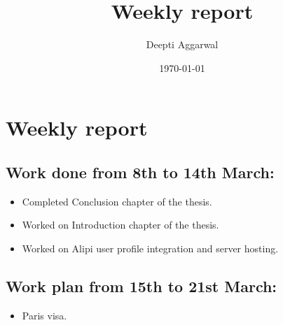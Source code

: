 \documentclass[11pt]{article}
\title{Weekly report}
\author{Deepti Aggarwal}
\date{\today}
\begin{document}
\maketitle

\setcounter{tocdepth}{3}
\vspace*{1cm}
\section{Weekly report}
\label{sec-1}

\subsection{Work done from 8th to 14th March:}
\label{sec-1-1}
\begin{itemize}
\item Completed Conclusion chapter of the thesis. 
\item Worked on Introduction chapter of the thesis. 
\item Worked on Alipi user profile integration and server hosting.
\end{itemize}

\subsection{Work plan from 15th to 21st March:}
\label{sec-1-1}
\begin{itemize}
\item Paris visa.
\end{itemize}
\end{document}
